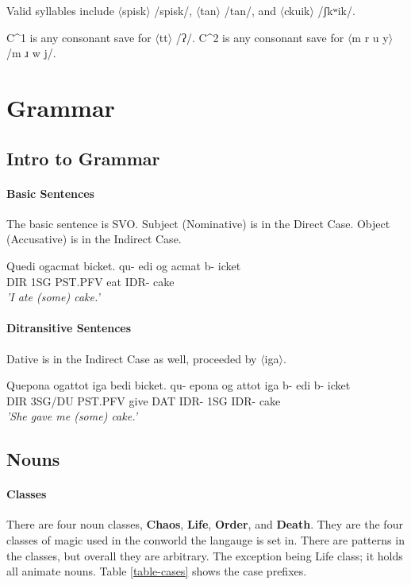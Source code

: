 \documentclass[11pt]{article}
\begin{document}
Valid syllables include 
$\langle$spisk$\rangle$ /spisk/,
$\langle$tan$\rangle$ /tan/,
and $\langle$ckuik$\rangle$ /ʃkʷik/.

C^1 is any consonant save for $\langle$tt$\rangle$ /ʔ/.
C^2 is any consonant save for $\langle$m r u y$\rangle$ /m ɹ w j/.

\section{Grammar}

\subsection{Intro to Grammar}

\paragraph{Basic Sentences}
The basic sentence is SVO.
Subject (Nominative) is in the Direct Case.
Object (Accusative) is in the Indirect Case.

\begin{exe}
\ex \label{basicsentence}
Quedi ogacmat bicket.
\gll
qu-  edi og      acmat b-   icket\\
DIR  1SG PST.PFV eat   IDR- cake\\
\trans 
    \textit{'I ate (some) cake.'}\\
\end{exe}

\paragraph{Ditransitive Sentences}
Dative is in the Indirect Case as well, proceeded by $\langle$iga$\rangle$.

\begin{exe}
\ex \label{basicsentence}
Quepona ogattot iga bedi bicket.
\gll
qu-  epona  og      attot iga b-   edi b-   icket\\
DIR  3SG/DU PST.PFV give  DAT IDR- 1SG IDR- cake\\
\trans 
    \textit{'She gave me (some) cake.'}\\
\end{exe}


\subsection{Nouns}

\paragraph{Classes}
There are four noun classes,
\textbf{Chaos}, \textbf{Life}, \textbf{Order}, and \textbf{Death}.
They are the four classes of magic used in the conworld the langauge is set in.
There are patterns in the classes, but overall they are arbitrary.
The exception being Life class;
it holds all animate nouns.
Table \ref{table-cases} shows the case prefixes.
\end{document}
